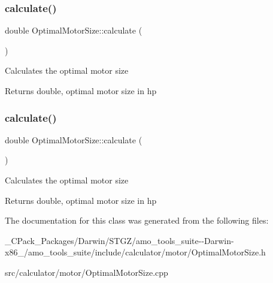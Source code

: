 \subsubsection{\texorpdfstring{calculate()}{calculate()}\hspace{0.1cm}{\footnotesize\ttfamily [2/3]}}
{\footnotesize\ttfamily double Optimal\+Motor\+Size\+::calculate (\begin{DoxyParamCaption}{ }\end{DoxyParamCaption})}

Calculates the optimal motor size \begin{DoxyReturn}{Returns}
double, optimal motor size in hp 
\end{DoxyReturn}
\mbox{\label{class_optimal_motor_size_aa9f4e68b9e1807d20e7738cd0789a539}} 
\subsubsection{\texorpdfstring{calculate()}{calculate()}\hspace{0.1cm}{\footnotesize\ttfamily [3/3]}}
{\footnotesize\ttfamily double Optimal\+Motor\+Size\+::calculate (\begin{DoxyParamCaption}{ }\end{DoxyParamCaption})}

Calculates the optimal motor size \begin{DoxyReturn}{Returns}
double, optimal motor size in hp 
\end{DoxyReturn}


The documentation for this class was generated from the following files\+:\begin{DoxyCompactItemize}
\item 
\+\_\+\+C\+Pack\+\_\+\+Packages/\+Darwin/\+S\+T\+G\+Z/amo\+\_\+tools\+\_\+suite-\/-\/\+Darwin-\/x86\+\_/amo\+\_\+tools\+\_\+suite/include/calculator/motor/Optimal\+Motor\+Size.\+h\item 
src/calculator/motor/Optimal\+Motor\+Size.\+cpp\end{DoxyCompactItemize}
